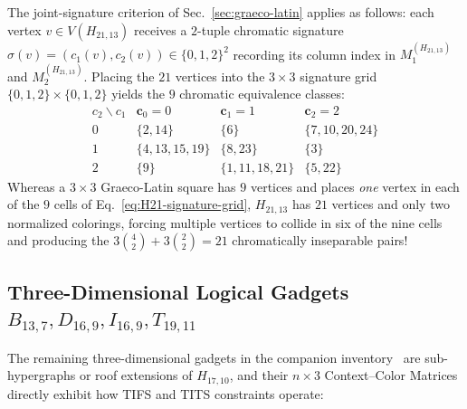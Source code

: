\documentclass[aps,pra,reprint,superscriptaddress,longbibliography,nofootinbib,floatfix,10pt]{revtex4-2}
\theoremstyle{definition}\newtheorem{definition}[theorem]{Definition}
\theoremstyle{remark}\newtheorem{remark}[theorem]{Remark}
\begin{document}
The joint-signature criterion of Sec.~\ref{sec:graeco-latin} applies as follows: each vertex $v\in V(H_{21,13})$ receives a $2$-tuple chromatic signature $\sigma(v)=(c_1(v),c_2(v))\in\{0,1,2\}^2$ recording its column index in $M_1^{(H_{21,13})}$ and $M_2^{(H_{21,13})}$. Placing the $21$ vertices into the $3\times 3$ signature grid $\{0,1,2\}\times\{0,1,2\}$ yields the $9$ chromatic equivalence classes:
\begin{equation}\label{eq:H21-signature-grid}
\begin{array}{c|ccc}
c_2\backslash c_1 & \mathbf{c}_0=0 & \mathbf{c}_1=1 & \mathbf{c}_2=2\\\hline
0 & \{2,14\} & \{6\} & \{7,10,20,24\}\\
1 & \{4,13,15,19\} & \{8,23\} & \{3\}\\
2 & \{9\} & \{1,11,18,21\} & \{5,22\}
\end{array}
\end{equation}
Whereas a $3\times 3$ Graeco-Latin square has $9$ vertices and places \emph{one} vertex in each of the $9$ cells of Eq.~\eqref{eq:H21-signature-grid}, $H_{21,13}$ has $21$ vertices and only two normalized colorings, forcing multiple vertices to collide in six of the nine cells and producing the $3\binom{4}{2}+3\binom{2}{2}=21$ chromatically inseparable pairs!

\subsection{Three-Dimensional Logical Gadgets \texorpdfstring{$B_{13,7},D_{16,9},I_{16,9},T_{19,11}$}{B13,7, D16,9, I16,9, T19,11}}\label{sec:3d-gadgets}

The remaining three-dimensional gadgets in the companion inventory~\cite{svozil2026contexts} are sub-hypergraphs or roof extensions of $H_{17,10}$, and their $n\times 3$ Context--Color Matrices directly exhibit how TIFS and TITS constraints operate:
\end{document}
